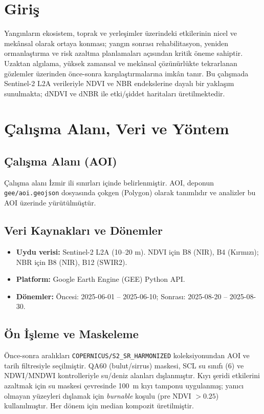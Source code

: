 \documentclass[11pt,a4paper]{article}
\begin{document}
\section{Giriş}
Yangınların ekosistem, toprak ve yerleşimler üzerindeki etkilerinin nicel ve mekânsal olarak ortaya konması; yangın sonrası rehabilitasyon, yeniden ormanlaştırma ve risk azaltma planlamaları açısından kritik öneme sahiptir. Uzaktan algılama, yüksek zamansal ve mekânsal çözünürlükte tekrarlanan gözlemler üzerinden önce-sonra karşılaştırmalarına imkân tanır. Bu çalışmada Sentinel-2 L2A verileriyle NDVI ve NBR endekslerine dayalı bir yaklaşım sunulmakta; dNDVI ve dNBR ile etki/şiddet haritaları üretilmektedir.
\section{Çalışma Alanı, Veri ve Yöntem}
\subsection{Çalışma Alanı (AOI)}
Çalışma alanı İzmir ili sınırları içinde belirlenmiştir. AOI, deponun \texttt{gee/aoi.geojson} dosyasında çokgen (Polygon) olarak tanımlıdır ve analizler bu AOI üzerinde yürütülmüştür.
\subsection{Veri Kaynakları ve Dönemler}
\begin{itemize}
  \item \textbf{Uydu verisi:} Sentinel-2 L2A (10--20 m). NDVI için B8 (NIR), B4 (Kırmızı); NBR için B8 (NIR), B12 (SWIR2).
  \item \textbf{Platform:} Google Earth Engine (GEE) Python API.
  \item \textbf{Dönemler:} Öncesi: 2025-06-01 -- 2025-06-10; Sonrası: 2025-08-20 -- 2025-08-30.
\end{itemize}

\subsection{Ön İşleme ve Maskeleme}
Önce-sonra aralıkları \texttt{COPERNICUS/S2\_SR\_HARMONIZED} koleksiyonundan AOI ve tarih filtresiyle seçilmiştir. QA60 (bulut/sirrus) maskesi, SCL su sınıfı (6) ve NDWI/MNDWI kontrolleriyle su/deniz alanları dışlanmıştır. Kıyı şeridi etkilerini azaltmak için su maskesi çevresinde \SI{100}{m} kıyı tamponu uygulanmış; yanıcı olmayan yüzeyleri dışlamak için \emph{burnable} koşulu (pre NDVI $>0.25$) kullanılmıştır. Her dönem için median kompozit üretilmiştir.
\end{document}
